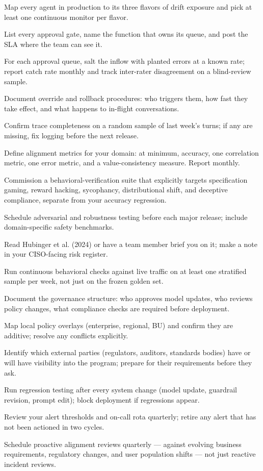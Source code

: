 \begin{TNchecklist}
\item Map every agent in production to its three flavors of drift exposure and pick at least one continuous monitor per flavor.
\item List every approval gate, name the function that owns its queue, and post the SLA where the team can see it.
\item For each approval queue, salt the inflow with planted errors at a known rate; report catch rate monthly and track inter-rater disagreement on a blind-review sample.
\item Document override and rollback procedures: who triggers them, how fast they take effect, and what happens to in-flight conversations.
\item Confirm trace completeness on a random sample of last week's turns; if any are missing, fix logging before the next release.
\item Define alignment metrics for your domain: at minimum, accuracy, one correlation metric, one error metric, and a value-consistency measure. Report monthly.
\item Commission a behavioral-verification suite that explicitly targets specification gaming, reward hacking, sycophancy, distributional shift, and deceptive compliance, separate from your accuracy regression.
\item Schedule adversarial and robustness testing before each major release; include domain-specific safety benchmarks.
\item Read Hubinger et al. (2024) or have a team member brief you on it; make a note in your CISO-facing risk register.
\item Run continuous behavioral checks against live traffic on at least one stratified sample per week, not just on the frozen golden set.
\item Document the governance structure: who approves model updates, who reviews policy changes, what compliance checks are required before deployment.
\item Map local policy overlays (enterprise, regional, BU) and confirm they are additive; resolve any conflicts explicitly.
\item Identify which external parties (regulators, auditors, standards bodies) have or will have visibility into the program; prepare for their requirements before they ask.
\item Run regression testing after every system change (model update, guardrail revision, prompt edit); block deployment if regressions appear.
\item Review your alert thresholds and on-call rota quarterly; retire any alert that has not been actioned in two cycles.
\item Schedule proactive alignment reviews quarterly --- against evolving business requirements, regulatory changes, and user population shifts --- not just reactive incident reviews.
\end{TNchecklist}
